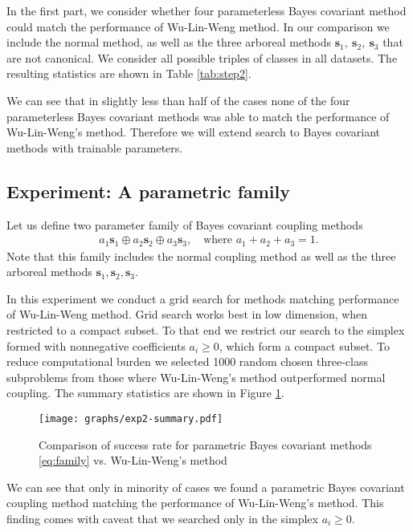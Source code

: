 In the first part, we consider whether four parameterless Bayes covariant method could match the performance of Wu-Lin-Weng method. In our comparison we include the normal method, as well as the three arboreal methods $ \boldsymbol{s}_1,~ \boldsymbol{s}_2,~ \boldsymbol{s}_3$ that are not canonical. We consider all possible triples of classes in all datasets. The resulting statistics are shown in Table \ref{tab:step2}. 



We can see that in slightly less than half of the cases none of the four parameterless Bayes covariant methods was able to match the performance of Wu-Lin-Weng's method. Therefore we will extend search to Bayes covariant methods with trainable parameters. 


\subsection{Experiment: A parametric family}

Let us define two parameter family of Bayes covariant coupling methods
\begin{align}
a_1 \boldsymbol{s}_1 \oplus a_2 \boldsymbol{s}_2 \oplus a_3 \boldsymbol{s}_3,\quad\textrm{where } a_1 + a_2 +a_3 = 1. \label{eq:family}
\end{align}
Note that this family includes the normal coupling method as well as the three arboreal methods $\boldsymbol{s}_1, \boldsymbol{s}_2, \boldsymbol{s}_3$.

In this experiment we  conduct a grid search for methods matching performance of Wu-Lin-Weng method. Grid search works best in low dimension, when restricted to a compact subset. To that end we restrict our search to the simplex formed with nonnegative coefficients $a_i \geq 0$, which form a compact subset.  To reduce computational burden we selected 1000 random chosen three-class subproblems from those where Wu-Lin-Weng's method outperformed normal coupling. The summary statistics are shown in Figure \ref{fig:par-bc}.

\begin{figure}[!ht]
\texttt{[image: graphs/exp2-summary.pdf]}
\caption{Comparison of success rate for parametric Bayes covariant methods \eqref{eq:family} vs. Wu-Lin-Weng's method}
\label{fig:par-bc}
\end{figure}

We can see that only in minority of cases we found a parametric Bayes covariant coupling method matching the performance of Wu-Lin-Weng's method. This finding comes with caveat that we searched only in the simplex $a_i \geq 0$. 

